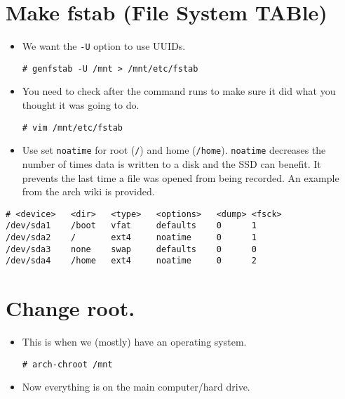 \documentclass{article}
\begin{document}
\section{Make fstab (File System TABle)}
  \begin{itemize}
    \item We want the \verb|-U| option to use UUIDs.
\begin{verbatim}
# genfstab -U /mnt > /mnt/etc/fstab
\end{verbatim}
    \item You need to check after the command runs to make sure it did what you
      thought it was going to do.
\begin{verbatim}
# vim /mnt/etc/fstab
\end{verbatim}
    \item Use set \verb|noatime| for root (\verb|/|) and home
      (\verb|/home|). \verb|noatime| decreases the number of times data is
      written to a disk and the SSD can benefit. It prevents the last time a
      file was opened from being recorded. An example from the arch wiki is
      provided.
  \end{itemize}
\begin{verbatim}
# <device>   <dir>   <type>   <options>   <dump> <fsck>
/dev/sda1    /boot   vfat     defaults    0      1
/dev/sda2    /       ext4     noatime     0      1
/dev/sda3    none    swap     defaults    0      0
/dev/sda4    /home   ext4     noatime     0      2
\end{verbatim}

\section{Change root.}
  \begin{itemize}
    \item This is when we (mostly) have an operating system.
\begin{verbatim}
# arch-chroot /mnt
\end{verbatim}
    \item Now everything is on the main computer/hard drive.
  \end{itemize}
\end{document}
